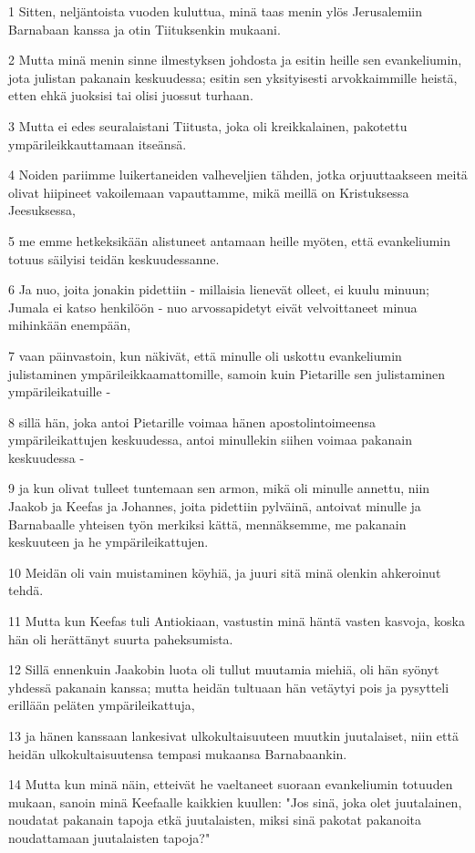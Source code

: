 \par 1 Sitten, neljäntoista vuoden kuluttua, minä taas menin ylös Jerusalemiin Barnabaan kanssa ja otin Tiituksenkin mukaani.
\par 2 Mutta minä menin sinne ilmestyksen johdosta ja esitin heille sen evankeliumin, jota julistan pakanain keskuudessa; esitin sen yksityisesti arvokkaimmille heistä, etten ehkä juoksisi tai olisi juossut turhaan.
\par 3 Mutta ei edes seuralaistani Tiitusta, joka oli kreikkalainen, pakotettu ympärileikkauttamaan itseänsä.
\par 4 Noiden pariimme luikertaneiden valheveljien tähden, jotka orjuuttaakseen meitä olivat hiipineet vakoilemaan vapauttamme, mikä meillä on Kristuksessa Jeesuksessa,
\par 5 me emme hetkeksikään alistuneet antamaan heille myöten, että evankeliumin totuus säilyisi teidän keskuudessanne.
\par 6 Ja nuo, joita jonakin pidettiin - millaisia lienevät olleet, ei kuulu minuun; Jumala ei katso henkilöön - nuo arvossapidetyt eivät velvoittaneet minua mihinkään enempään,
\par 7 vaan päinvastoin, kun näkivät, että minulle oli uskottu evankeliumin julistaminen ympärileikkaamattomille, samoin kuin Pietarille sen julistaminen ympärileikatuille -
\par 8 sillä hän, joka antoi Pietarille voimaa hänen apostolintoimeensa ympärileikattujen keskuudessa, antoi minullekin siihen voimaa pakanain keskuudessa -
\par 9 ja kun olivat tulleet tuntemaan sen armon, mikä oli minulle annettu, niin Jaakob ja Keefas ja Johannes, joita pidettiin pylväinä, antoivat minulle ja Barnabaalle yhteisen työn merkiksi kättä, mennäksemme, me pakanain keskuuteen ja he ympärileikattujen.
\par 10 Meidän oli vain muistaminen köyhiä, ja juuri sitä minä olenkin ahkeroinut tehdä.
\par 11 Mutta kun Keefas tuli Antiokiaan, vastustin minä häntä vasten kasvoja, koska hän oli herättänyt suurta paheksumista.
\par 12 Sillä ennenkuin Jaakobin luota oli tullut muutamia miehiä, oli hän syönyt yhdessä pakanain kanssa; mutta heidän tultuaan hän vetäytyi pois ja pysytteli erillään peläten ympärileikattuja,
\par 13 ja hänen kanssaan lankesivat ulkokultaisuuteen muutkin juutalaiset, niin että heidän ulkokultaisuutensa tempasi mukaansa Barnabaankin.
\par 14 Mutta kun minä näin, etteivät he vaeltaneet suoraan evankeliumin totuuden mukaan, sanoin minä Keefaalle kaikkien kuullen: "Jos sinä, joka olet juutalainen, noudatat pakanain tapoja etkä juutalaisten, miksi sinä pakotat pakanoita noudattamaan juutalaisten tapoja?"
